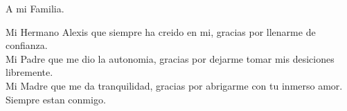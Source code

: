 %
\label{sec:Agradecimientos}

A mi Familia.

Mi Hermano Alexis que siempre ha creido en mi, gracias por llenarme de confianza.\\
Mi Padre que me dio la autonomia, gracias por dejarme tomar mis desiciones libremente.\\
Mi Madre que me da tranquilidad, gracias por abrigarme con tu inmerso amor.\\

Siempre estan conmigo.
